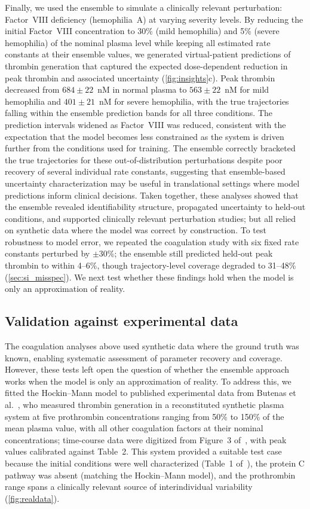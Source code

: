\documentclass[preprint,review,12pt]{elsarticle}
\begin{document}
Finally, we used the ensemble to simulate a clinically relevant perturbation: Factor~VIII deficiency (hemophilia~A) at varying severity levels. By reducing the initial Factor~VIII concentration to 30\% (mild hemophilia) and 5\% (severe hemophilia) of the nominal plasma level while keeping all estimated rate constants at their ensemble values, we generated virtual-patient predictions of thrombin generation that captured the expected dose-dependent reduction in peak thrombin and associated uncertainty (\cref{fig:insights}c). Peak thrombin decreased from $684 \pm 22$~nM in normal plasma to $563 \pm 22$~nM for mild hemophilia and $401 \pm 21$~nM for severe hemophilia, with the true trajectories falling within the ensemble prediction bands for all three conditions. The prediction intervals widened as Factor~VIII was reduced, consistent with the expectation that the model becomes less constrained as the system is driven further from the conditions used for training. The ensemble correctly bracketed the true trajectories for these out-of-distribution perturbations despite poor recovery of several individual rate constants, suggesting that ensemble-based uncertainty characterization may be useful in translational settings where model predictions inform clinical decisions. Taken together, these analyses showed that the ensemble revealed identifiability structure, propagated uncertainty to held-out conditions, and supported clinically relevant perturbation studies; but all relied on synthetic data where the model was correct by construction. To test robustness to model error, we repeated the coagulation study with six fixed rate constants perturbed by $\pm 30\%$; the ensemble still predicted held-out peak thrombin to within 4--6\%, though trajectory-level coverage degraded to 31--48\% (\cref{sec:si_misspec}). We next test whether these findings hold when the model is only an approximation of reality.

\subsection{Validation against experimental data}\label{sec:realdata}
The coagulation analyses above used synthetic data where the ground truth was known, enabling systematic assessment of parameter recovery and coverage. However, these tests left open the question of whether the ensemble approach works when the model is only an approximation of reality. To address this, we fitted the Hockin--Mann model to published experimental data from Butenas et al.~\cite{Butenas1999}, who measured thrombin generation in a reconstituted synthetic plasma system at five prothrombin concentrations ranging from 50\% to 150\% of the mean plasma value, with all other coagulation factors at their nominal concentrations; time-course data were digitized from Figure~3 of~\cite{Butenas1999}, with peak values calibrated against Table~2. This system provided a suitable test case because the initial conditions were well characterized (Table~1 of~\cite{Butenas1999}), the protein C pathway was absent (matching the Hockin--Mann model), and the prothrombin range spans a clinically relevant source of interindividual variability (\cref{fig:realdata}).
\end{document}
